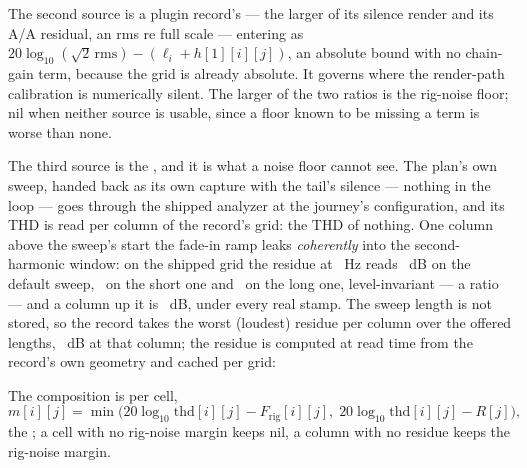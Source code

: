 \documentclass[11pt,a4paper]{article}
\begin{document}
The second source is a plugin record's  --- the
larger of its silence render and its A/A residual, an rms re full scale
--- entering as $20\log_{10}(\sqrt2\,\mathrm{rms}) - (\ell_i + h[1][i][j])$,
an absolute bound with no chain-gain term, because the grid is already
absolute. It governs where the render-path calibration is numerically
silent. The larger of the two ratios is the rig-noise floor; nil when
neither source is usable, since a floor known to be missing a term is
worse than none.

The third source is the , and it is what a noise
floor cannot see. The plan's own sweep, handed back as its own capture
with the tail's silence --- nothing in the loop --- goes through the
shipped analyzer at the journey's configuration, and its THD is read per
column of the record's grid: the THD of nothing. One column above the
sweep's start the fade-in ramp leaks \emph{coherently} into the
second-harmonic window: on the shipped grid the residue at
\journeyResidueColumnOneHz\ Hz reads \journeyResidueColumnOneFive\ dB on the
default sweep, \journeyResidueColumnOneTwo\ on the short one and
\journeyResidueColumnOneTen\ on the long one, level-invariant --- a ratio
--- and a column up it is \journeyResidueColumnTwoFive\ dB, under every real
stamp. The sweep length is not stored, so the record takes the worst
(loudest) residue per column over the offered lengths,
\journeyResidueWorstColumnOne\ dB at that column; the residue is computed
at read time from the record's own geometry and cached per grid:
\begin{center}\small\journeyResidueTable\end{center}
The composition is per cell,
\begin{equation}
  m[i][j] = \min\!\Big(20\log_{10}\mathrm{thd}[i][j] - F_{\mathrm{rig}}[i][j],\;
  20\log_{10}\mathrm{thd}[i][j] - R[j]\Big),
  \label{eq:composed}
\end{equation}
the ; a cell with no rig-noise margin keeps nil, a
column with no residue keeps the rig-noise margin.
\end{document}
